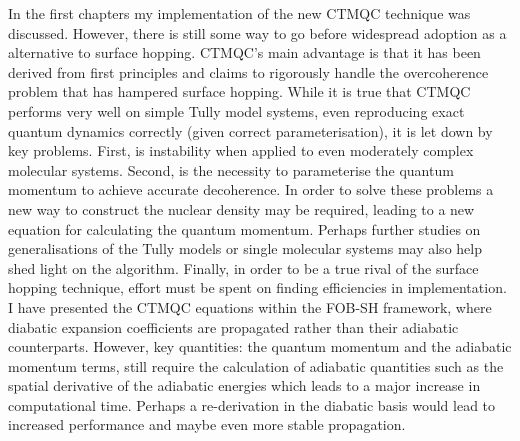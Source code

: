 In the first  chapters my implementation of the new CTMQC technique was discussed. However, there is still some way to go before  widespread adoption as a alternative to surface hopping. CTMQC's main advantage is that it has been derived from first principles and claims to rigorously handle the overcoherence problem that has hampered surface hopping. While it is true that CTMQC performs very well on simple  Tully model systems, even reproducing exact quantum dynamics correctly (given correct parameterisation), it is let down by  key problems. First, is  instability when applied to even moderately complex molecular systems. Second, is the necessity to parameterise the quantum momentum to achieve accurate decoherence. In order to solve these problems a new way to construct the nuclear density may be required, leading to a new equation for calculating the quantum momentum. Perhaps further studies on  generalisations of the Tully models or single molecular systems may also help shed light on the algorithm. Finally, in order to be a true rival of the surface hopping technique, effort must be spent on finding efficiencies in  implementation. I have presented the CTMQC equations within the FOB-SH framework, where diabatic expansion coefficients are propagated rather than their adiabatic counterparts. However,  key quantities: the quantum momentum and the adiabatic momentum terms, still require the calculation of adiabatic quantities such as the spatial derivative of the adiabatic energies which leads to a major increase in computational time. Perhaps a re-derivation in the diabatic basis would lead to increased performance and maybe even more stable propagation.
\\\\
